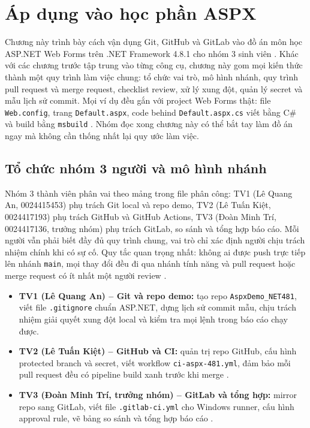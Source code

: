 \section{Áp dụng vào học phần ASPX}
\label{sec:c7-apdung}

Chương này trình bày cách vận dụng Git, GitHub và GitLab vào đồ án môn học ASP.NET Web Forms trên .NET Framework 4.8.1 cho nhóm 3 sinh viên \cite{progit,githubdocs,gitlabdocs,msnetfx}.
Khác với các chương trước tập trung vào từng công cụ, chương này gom mọi kiến thức thành một quy trình làm việc chung: tổ chức vai trò, mô hình nhánh, quy trình pull request và merge request, checklist review, xử lý xung đột, quản lý secret và mẫu lịch sử commit.
Mọi ví dụ đều gắn với project Web Forms thật: file \texttt{Web.config}, trang \texttt{Default.aspx}, code behind \texttt{Default.aspx.cs} viết bằng C\# và build bằng \verb|msbuild| \cite{msmsbuild}.
Nhóm đọc xong chương này có thể bắt tay làm đồ án ngay mà không cần thống nhất lại quy ước làm việc.

\subsection{Tổ chức nhóm 3 người và mô hình nhánh}
\label{subsec:c7-tochuc}

Nhóm 3 thành viên phân vai theo mảng trong file phân công: TV1 (Lê Quang An, 0024415453) phụ trách Git local và repo demo, TV2 (Lê Tuấn Kiệt, 0024417193) phụ trách GitHub và GitHub Actions, TV3 (Đoàn Minh Trí, 0024417136, trưởng nhóm) phụ trách GitLab, so sánh và tổng hợp báo cáo.
Mỗi người vẫn phải biết đầy đủ quy trình chung, vai trò chỉ xác định người chịu trách nhiệm chính khi có sự cố.
Quy tắc quan trọng nhất: không ai được push trực tiếp lên nhánh \texttt{main}, mọi thay đổi đều đi qua nhánh tính năng và pull request hoặc merge request có ít nhất một người review \cite{atlassiangit,githubdocs,gitlabdocs}.

\begin{itemize}
\item \textbf{TV1 (Lê Quang An) -- Git và repo demo:} tạo repo \texttt{AspxDemo\_NET481}, viết file \verb|.gitignore| chuẩn ASP.NET, dựng lịch sử commit mẫu, chịu trách nhiệm giải quyết xung đột local và kiểm tra mọi lệnh trong báo cáo chạy được.
\item \textbf{TV2 (Lê Tuấn Kiệt) -- GitHub và CI:} quản trị repo GitHub, cấu hình protected branch và secret, viết workflow \texttt{ci-aspx-481.yml}, đảm bảo mỗi pull request đều có pipeline build xanh trước khi merge \cite{ghactions}.
\item \textbf{TV3 (Đoàn Minh Trí, trưởng nhóm) -- GitLab và tổng hợp:} mirror repo sang GitLab, viết file \verb|.gitlab-ci.yml| cho Windows runner, cấu hình approval rule, vẽ bảng so sánh và tổng hợp báo cáo \cite{gitlabci}.
\end{itemize}

